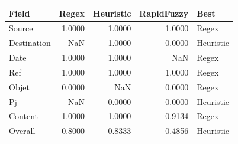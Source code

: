 \begin{tabular}{lrrrl}
\toprule
Field & Regex & Heuristic & RapidFuzzy & Best \\
\midrule
Source & 1.0000 & 1.0000 & 1.0000 & Regex \\
Destination & NaN & 1.0000 & 0.0000 & Heuristic \\
Date & 1.0000 & 1.0000 & NaN & Regex \\
Ref & 1.0000 & 1.0000 & 1.0000 & Regex \\
Objet & 0.0000 & NaN & 0.0000 & Regex \\
Pj & NaN & 0.0000 & 0.0000 & Heuristic \\
Content & 1.0000 & 1.0000 & 0.9134 & Regex \\
Overall & 0.8000 & 0.8333 & 0.4856 & Heuristic \\
\bottomrule
\end{tabular}
